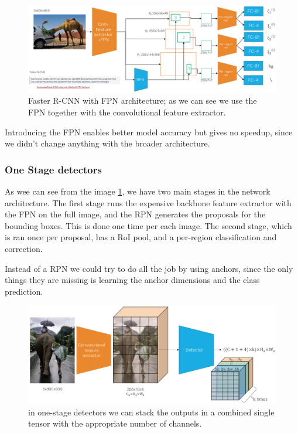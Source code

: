 \begin{figure}[htbp]
  \centering
  \includegraphics[width=0.8\linewidth]{./img/frcnn_fpn.png}
  \caption{Faster R-CNN with FPN architecture; as we can see we use the FPN together with the convolutional feature extractor.}
  \label{fig:frcnn_fpn}
\end{figure}

Introducing the FPN enables better model accuracy but gives no speedup, since we didn't change anything with the broader architecture.

\subsubsection{One Stage detectors}
As wee can see from the image \ref{fig:frcnn_fpn}, we have two main stages in the network architecture.
The first stage runs the expensive backbone feature extractor with the FPN on the full image, and the RPN generates the proposals for the bounding boxes.
This is done one time per each image.
The second stage, which is ran once per proposal, has a RoI pool, and a per-region classification and correction.

Instead of a RPN we could try to do all the job by using anchors, since the only things they are missing is learning the anchor dimensions and the class prediction.

\begin{figure}[htbp]
  \centering
  \includegraphics[width=0.8\linewidth]{./img/one_stage_detector.png}
  \caption{in one-stage detectors we can stack the outputs in a combined single tensor with the appropriate number of channels.}
\end{figure}

